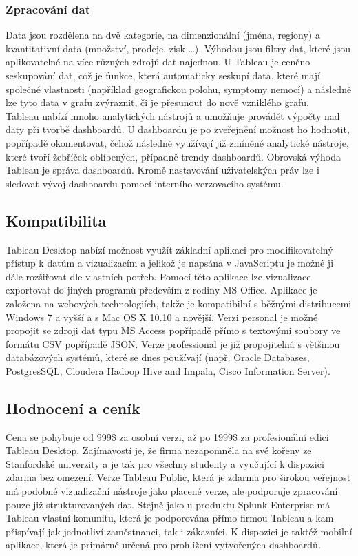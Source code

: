 \documentclass[czech,BP]{thesiskiv}
\begin{document}
 \subsubsection{Zpracování dat}
 Data jsou rozdělena na dvě kategorie, na dimenzionální (jména, regiony) a kvantitativní data (množství, prodeje, zisk …). Výhodou jsou filtry dat, které jsou aplikovatelné na více různých zdrojů dat najednou. U Tableau je ceněno seskupování dat, což je funkce, která automaticky seskupí data, které mají společné vlastnosti (například geografickou polohu, symptomy nemocí) a následně lze tyto data v grafu zvýraznit, či je přesunout do nově vzniklého grafu.\cite{TableauDimensions}
 \\
 Tableau nabízí mnoho analytických nástrojů a umožňuje provádět výpočty nad daty při tvorbě dashboardů. U dashboardu je po zveřejnění možnost ho hodnotit, popřípadě okomentovat, čehož následně využívají již zmíněné analytické nástroje, které tvoří žebříček oblíbených, případně trendy dashboardů. Obrovská výhoda Tableau je správa dashboardů. Kromě nastavování uživatelských práv lze i sledovat vývoj dashboardu pomocí interního verzovacího systému.\cite{TableauVersion}
  
 \subsection{Kompatibilita}
 Tableau Desktop nabízí možnost využít základní aplikaci pro modifikovatelný přístup k datům a vizualizacím a jelikož je napsána v JavaScriptu je možné ji dále rozšiřovat dle vlastních potřeb. Pomocí této aplikace lze vizualizace exportovat do jiných programů především z rodiny MS Office. Aplikace je založena na webových technologiích, takže je kompatibilní s běžnými distribucemi Windows 7 a vyšší a s Mac OS X 10.10 a novější. Verzi personal je možné propojit se zdroji dat typu MS Access popřípadě přímo s textovými soubory ve formátu CSV popřípadě JSON. Verze professional je již propojitelná s většinou databázových systémů, které se dnes používají (např. Oracle Databases, PostgresSQL, Cloudera Hadoop Hive and Impala, Cisco Information Server).\cite{TableauSources}
 
 \subsection{Hodnocení a ceník}
 Cena se pohybuje od 999\$ za osobní verzi, až po 1999\$ za profesionální edici Tableau Desktop.\cite{TableauPricing} Zajímavostí je, že firma nezapomněla na své kořeny ze Stanfordské univerzity a je tak pro všechny studenty a vyučující k dispozici zdarma bez omezení. Verze Tableau Public, která je zdarma pro širokou veřejnost má podobné vizualizační nástroje jako placené verze, ale podporuje zpracování pouze již strukturovaných dat. Stejně jako u produktu Splunk Enterprise má Tableau vlastní komunitu, která je podporována přímo firmou Tableau a kam přispívají jak jednotliví zaměstnanci, tak i zákazníci. K dispozici je taktéž mobilní aplikace, která je primárně určená pro prohlížení vytvořených dashboardů. 
 
\end{document}
